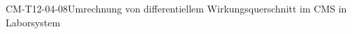 
\begin{PROP}{CM-T12-04-08}{Umrechnung von differentiellem Wirkungsquerschnitt im CMS in Laborsystem}
\end{PROP}
